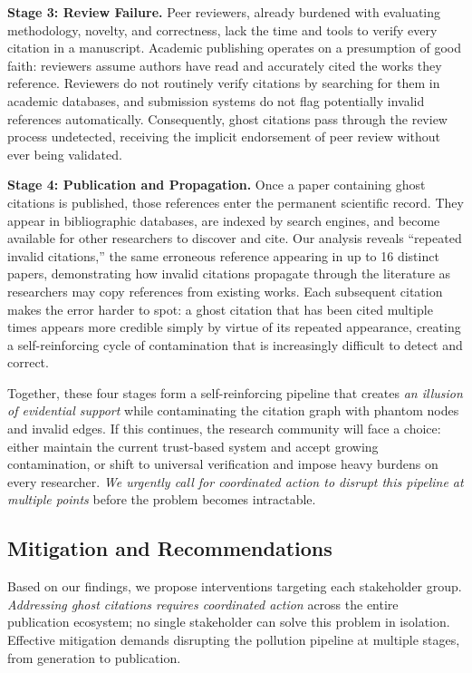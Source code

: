 \noindent
\textbf{Stage 3: Review Failure.}
Peer reviewers, already burdened with evaluating methodology, novelty, and correctness, lack the time and tools to verify every citation in a manuscript. 
Academic publishing operates on a presumption of good faith: reviewers assume authors have read and accurately cited the works they reference. Reviewers do not routinely verify citations by searching for them in academic databases, and submission systems do not flag potentially invalid references automatically. Consequently, ghost citations pass through the review process undetected, receiving the implicit endorsement of peer review without ever being validated.

\noindent
\textbf{Stage 4: Publication and Propagation.}
Once a paper containing ghost citations is published, those references enter the permanent scientific record. They appear in bibliographic databases, are indexed by search engines, and become available for other researchers to discover and cite. Our analysis reveals ``repeated invalid citations,'' the same erroneous reference appearing in up to 16 distinct papers, demonstrating how invalid citations propagate through the literature as researchers may copy references from existing works. Each subsequent citation makes the error harder to spot: a ghost citation that has been cited multiple times appears more credible simply by virtue of its repeated appearance, creating a self-reinforcing cycle of contamination that is increasingly difficult to detect and correct.

Together, these four stages form a self-reinforcing pipeline that creates \textit{an illusion of evidential support} while contaminating the citation graph with phantom nodes and invalid edges.
If this continues, the research community will face a choice: either maintain the current trust-based system and accept growing contamination, or shift to universal verification and impose heavy burdens on every researcher.
\textit{We urgently call for coordinated action to disrupt this pipeline at multiple points} before the problem becomes intractable.

\subsection{Mitigation and Recommendations}

Based on our findings, we propose interventions targeting each stakeholder group.
\textit{Addressing ghost citations requires coordinated action} across the entire publication ecosystem; no single stakeholder can solve this problem in isolation.
Effective mitigation demands disrupting the pollution pipeline at multiple stages, from generation to publication.

